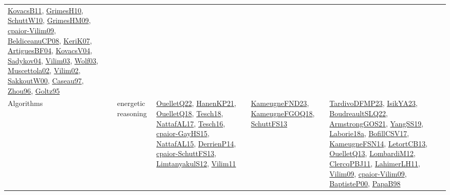 {\begin{longtable}{llp{6cm}p{6cm}p{6cm}}
\href{articles/KovacsB11.pdf}{KovacsB11}\cite{KovacsB11}, \href{papers/GrimesH10.pdf}{GrimesH10}\cite{GrimesH10}, \href{papers/SchuttW10.pdf}{SchuttW10}\cite{SchuttW10}, \href{papers/GrimesHM09.pdf}{GrimesHM09}\cite{GrimesHM09}, \href{papers/cpaior-Vilim09.pdf}{cpaior-Vilim09}\cite{cpaior-Vilim09}, \href{papers/BeldiceanuCP08.pdf}{BeldiceanuCP08}\cite{BeldiceanuCP08}, \href{papers/KeriK07.pdf}{KeriK07}\cite{KeriK07}, \href{papers/ArtiguesBF04.pdf}{ArtiguesBF04}\cite{ArtiguesBF04}, \href{papers/KovacsV04.pdf}{KovacsV04}\cite{KovacsV04}, \href{papers/Sadykov04.pdf}{Sadykov04}\cite{Sadykov04}, \href{papers/Vilim03.pdf}{Vilim03}\cite{Vilim03}, \href{papers/Wolf03.pdf}{Wolf03}\cite{Wolf03}, \href{papers/Muscettola02.pdf}{Muscettola02}\cite{Muscettola02}, \href{papers/Vilim02.pdf}{Vilim02}\cite{Vilim02}, \href{articles/SakkoutW00.pdf}{SakkoutW00}\cite{SakkoutW00}, \href{papers/Caseau97.pdf}{Caseau97}\cite{Caseau97}, \href{papers/Zhou96.pdf}{Zhou96}\cite{Zhou96}, \href{papers/Goltz95.pdf}{Goltz95}\cite{Goltz95}\\
Algorithms & energetic reasoning & \href{papers/OuelletQ22.pdf}{OuelletQ22}\cite{OuelletQ22}, \href{papers/HanenKP21.pdf}{HanenKP21}\cite{HanenKP21}, \href{papers/OuelletQ18.pdf}{OuelletQ18}\cite{OuelletQ18}, \href{papers/Tesch18.pdf}{Tesch18}\cite{Tesch18}, \href{articles/NattafAL17.pdf}{NattafAL17}\cite{NattafAL17}, \href{papers/Tesch16.pdf}{Tesch16}\cite{Tesch16}, \href{papers/cpaior-GayHS15.pdf}{cpaior-GayHS15}\cite{cpaior-GayHS15}, \href{articles/NattafAL15.pdf}{NattafAL15}\cite{NattafAL15}, \href{papers/DerrienP14.pdf}{DerrienP14}\cite{DerrienP14}, \href{papers/cpaior-SchuttFS13.pdf}{cpaior-SchuttFS13}\cite{cpaior-SchuttFS13}, \href{articles/LimtanyakulS12.pdf}{LimtanyakulS12}\cite{LimtanyakulS12}, \href{papers/Vilim11.pdf}{Vilim11}\cite{Vilim11} & \href{papers/KameugneFND23.pdf}{KameugneFND23}\cite{KameugneFND23}, \href{papers/KameugneFGOQ18.pdf}{KameugneFGOQ18}\cite{KameugneFGOQ18}, \href{papers/SchuttFS13.pdf}{SchuttFS13}\cite{SchuttFS13} & \href{papers/TardivoDFMP23.pdf}{TardivoDFMP23}\cite{TardivoDFMP23}, \href{articles/IsikYA23.pdf}{IsikYA23}\cite{IsikYA23}, \href{papers/BoudreaultSLQ22.pdf}{BoudreaultSLQ22}\cite{BoudreaultSLQ22}, \href{papers/ArmstrongGOS21.pdf}{ArmstrongGOS21}\cite{ArmstrongGOS21}, \href{papers/YangSS19.pdf}{YangSS19}\cite{YangSS19}, \href{papers/Laborie18a.pdf}{Laborie18a}\cite{Laborie18a}, \href{papers/BofillCSV17.pdf}{BofillCSV17}\cite{BofillCSV17}, \href{articles/KameugneFSN14.pdf}{KameugneFSN14}\cite{KameugneFSN14}, \href{papers/LetortCB13.pdf}{LetortCB13}\cite{LetortCB13}, \href{papers/OuelletQ13.pdf}{OuelletQ13}\cite{OuelletQ13}, \href{articles/LombardiM12.pdf}{LombardiM12}\cite{LombardiM12}, \href{papers/ClercqPBJ11.pdf}{ClercqPBJ11}\cite{ClercqPBJ11}, \href{papers/LahimerLH11.pdf}{LahimerLH11}\cite{LahimerLH11}, \href{papers/Vilim09.pdf}{Vilim09}\cite{Vilim09}, \href{papers/cpaior-Vilim09.pdf}{cpaior-Vilim09}\cite{cpaior-Vilim09}, \href{articles/BaptisteP00.pdf}{BaptisteP00}\cite{BaptisteP00}, \href{articles/PapaB98.pdf}{PapaB98}\cite{PapaB98}\\

\end{longtable}}
